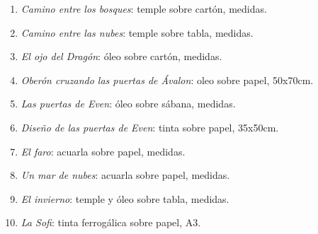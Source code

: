 \documentclass[twoside]{article}
\begin{document}
  \begin{enumerate}
    \item \textit{Camino entre los bosques}: temple sobre cartón, medidas.
    \item \textit{Camino entre las nubes}: temple sobre tabla, medidas.
    \item \textit{El ojo del Dragón}: óleo sobre cartón, medidas.
    \item \textit{Oberón cruzando las puertas de Ávalon}: oleo sobre papel, 50x70cm.
    \item \textit{Las puertas de Even}: óleo sobre sábana, medidas.
    \item \textit{Diseño de las puertas de Even}: tinta sobre papel, 35x50cm.
    \item \textit{El faro}: acuarla sobre papel, medidas.
    \item \textit{Un mar de nubes}: acuarla sobre papel, medidas.
    \item \textit{El invierno}: temple y óleo sobre tabla, medidas.
    \item \textit{La Sofi}: tinta ferrogálica sobre papel, A3.
    
  \end{enumerate}
\end{document}
